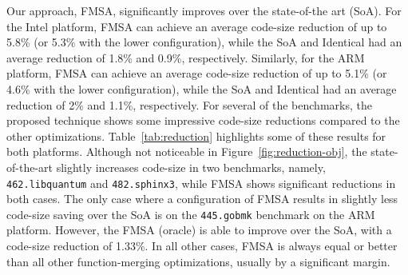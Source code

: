 Our approach, FMSA, significantly improves over the state-of-the art (SoA). For the Intel platform, FMSA can achieve an average code-size
reduction of up to 5.8\% (or 5.3\% with the lower configuration), while the SoA and Identical had an average reduction of 1.8\% and 0.9\%,
respectively. Similarly, for the ARM platform, FMSA can achieve an average code-size reduction of up to 5.1\% (or 4.6\% with the lower
configuration), while the SoA and Identical had an average reduction of 2\% and 1.1\%, respectively. For several of the benchmarks, the
proposed technique shows some impressive code-size reductions compared to the other optimizations. Table~\ref{tab:reduction} highlights
some of these results for both platforms. Although not noticeable in Figure~\ref{fig:reduction-obj}, the state-of-the-art slightly
increases code-size in two benchmarks, namely, \texttt{462.libquantum} and \texttt{482.sphinx3}, while FMSA shows significant reductions in
both cases. The only case where a configuration of FMSA results in slightly less code-size saving over the SoA is on the \texttt{445.gobmk}
benchmark on the ARM platform. However, the FMSA (oracle) is able to improve over the SoA, with a code-size reduction of 1.33\%. In all
other cases, FMSA is always equal or better than all other function-merging optimizations, usually by a significant margin.

